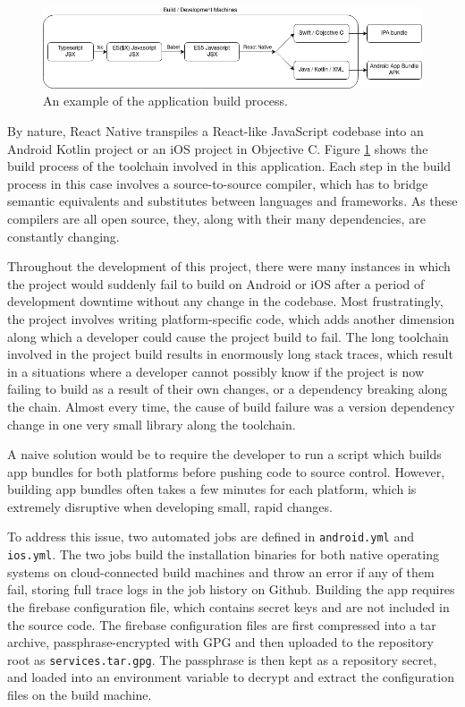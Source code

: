 \begin{figure}[h]
    \begin{center}
        \includegraphics[scale=0.55]{images/app_build_path.png}
    \end{center}
    \caption{An example of the application build process.}
    \label{fig:app_build_process}
\end{figure}

By nature, React Native transpiles a React-like JavaScript codebase into an Android Kotlin project or an iOS project in Objective C. Figure \ref{fig:app_build_process} shows the build process of the toolchain involved in this application. Each step in the build process in this case involves a source-to-source compiler, which has to bridge semantic equivalents and substitutes between languages and frameworks. As these compilers are all open source, they, along with their many dependencies, are constantly changing.

Throughout the development of this project, there were many instances in which the project would suddenly fail to build on Android or iOS after a period of development downtime without any change in the codebase. Most frustratingly, the project involves writing platform-specific code, which adds another dimension along which a developer could cause the project build to fail. The long toolchain involved in the project build results in enormously long stack traces, which result in a situations where a developer cannot possibly know if the project is now failing to build as a result of their own changes, or a dependency breaking along the chain. Almost every time, the cause of build failure was a version dependency change in one very small library along the toolchain.

A naive solution would be to require the developer to run a script which builds app bundles for both platforms before pushing code to source control. However, building app bundles often takes a few minutes for each platform, which is extremely disruptive when developing small, rapid changes.

To address this issue, two automated jobs are defined in \texttt{android.yml} and \texttt{ios.yml}. The two jobs build the installation binaries for both native operating systems on cloud-connected build machines and throw an error if any of them fail, storing full trace logs in the job history on Github. Building the app requires the firebase configuration file, which contains secret keys and are not included in the source code. The firebase configuration files are first compressed into a tar archive, passphrase-encrypted with GPG and then uploaded to the repository root as \texttt{services.tar.gpg}. The passphrase is then kept as a repository secret, and loaded into an environment variable to decrypt and extract the configuration files on the build machine.

